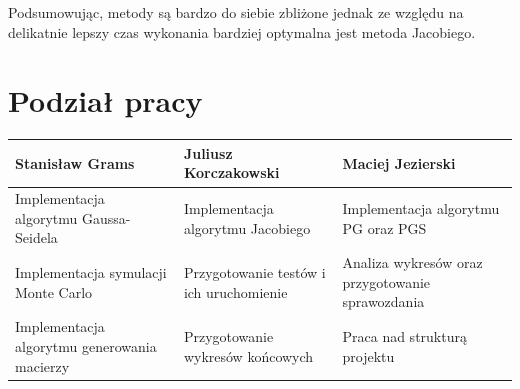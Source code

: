 \documentclass[10pt]{article}
\begin{document}
Podsumowując, metody są bardzo do siebie zbliżone jednak ze względu na delikatnie lepszy czas wykonania bardziej optymalna jest metoda Jacobiego.

\section{Podział pracy}
\centering
	\begin{tabular}{| p{5cm} | p{5cm} | p{5cm} |}
		\hline
		\textbf{Stanisław Grams} & \textbf{Juliusz Korczakowski} & \textbf{Maciej Jezierski} \\ \hline
		Implementacja algorytmu Gaussa-Seidela & Implementacja algorytmu Jacobiego & Implementacja algorytmu PG oraz PGS  \\ \hline
		 Implementacja symulacji Monte Carlo& Przygotowanie testów i ich uruchomienie &Analiza wykresów oraz przygotowanie sprawozdania \\ \hline
		Implementacja algorytmu generowania macierzy & Przygotowanie wykresów końcowych &Praca nad strukturą projektu\\ \hline
	\end{tabular}
\end{document}
